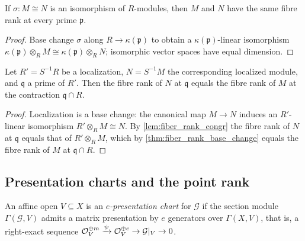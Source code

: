 \begin{lemma}
  \label{lem:fiber_rank_congr}
  \leanok
  If \(\sigma : M \cong N\) is an isomorphism of \(R\)-modules, then \(M\) and
  \(N\) have the same fibre rank at every prime \(\mathfrak p\).
\end{lemma}

\begin{proof}
  \leanok
  Base change \(\sigma\) along \(R \to \kappa(\mathfrak p)\) to obtain a
  \(\kappa(\mathfrak p)\)-linear isomorphism
  \(\kappa(\mathfrak p) \otimes_R M \cong \kappa(\mathfrak p) \otimes_R N\);
  isomorphic vector spaces have equal dimension.
\end{proof}

\begin{corollary}
  \label{cor:fiber_rank_localized}
  \leanok
  Let \(R' = S^{-1}R\) be a localization, \(N = S^{-1}M\) the corresponding
  localized module, and \(\mathfrak q\) a prime of \(R'\).  Then the fibre
  rank of \(N\) at \(\mathfrak q\) equals the fibre rank of \(M\) at the
  contraction \(\mathfrak q \cap R\).
\end{corollary}

\begin{proof}
  \leanok
  Localization is a base change: the canonical map \(M \to N\) induces an
  \(R'\)-linear isomorphism \(R' \otimes_R M \cong N\).  By
  \cref{lem:fiber_rank_congr} the fibre rank of \(N\) at \(\mathfrak q\)
  equals that of \(R' \otimes_R M\), which by \cref{thm:fiber_rank_base_change}
  equals the fibre rank of \(M\) at \(\mathfrak q \cap R\).
\end{proof}

\subsection{Presentation charts and the point rank}

\begin{definition}
  \label{def:presentation_chart}
  \leanok
  An affine open \(V \subseteq X\) is an \emph{\(e\)-presentation chart} for
  \(\mathcal G\) if the section module \(\Gamma(\mathcal G, V)\) admits a
  matrix presentation by \(e\) generators over \(\Gamma(X, V)\), that is, a
  right-exact sequence
  \(\mathcal{O}_V^{\oplus m} \xrightarrow{\psi} \mathcal{O}_V^{\oplus e}
    \to \mathcal G|_V \to 0\).
\end{definition}

